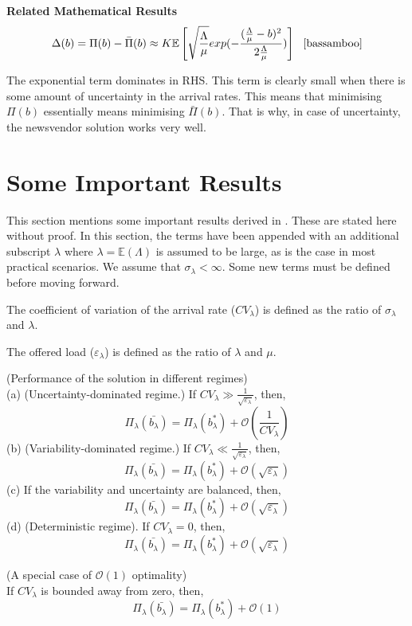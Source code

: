 \textbf{Related Mathematical Results}\\
\[\Delta(b) = \Pi(b) - \bar{\Pi}(b) \approx K\mathbb{E}\left[\sqrt{\frac{\Lambda}{\mu}}exp(-\frac{(\frac{\Lambda}{\mu}-b)^2}{2\frac{\Lambda}{\mu}})\right] \ \ \cite{bassamboo}\]

\begin{remark}
The exponential term dominates in RHS. This term is clearly small when there is some amount of uncertainty in the arrival rates. This means that minimising $\Pi(b)$ essentially means minimising $\bar{\Pi}(b)$. That is why, in case of uncertainty, the newsvendor solution works very well.   
\end{remark}
\section{Some Important Results}
This section mentions some important results derived in \cite{bassamboo}. These are stated here without proof. In this section, the terms have been appended with an additional subscript $\lambda$ where $\lambda=\mathbb{E}(\Lambda)$ is assumed to be large, as is the case in most practical scenarios. We assume that $\sigma_{\lambda} < \infty$. Some new terms must be defined before moving forward.
\begin{definition}\label{}
The coefficient of variation of the arrival rate ($CV_{\lambda}$) is defined as the ratio of $\sigma_{\lambda}$ and $\lambda$.
\end{definition}

\begin{definition}\label{}
The offered load ($\varepsilon_{\lambda}$) is defined as the ratio of $\lambda$ and $\mu$.
\end{definition}

\begin{theorem} (Performance of the solution in different regimes) \\
(a) (Uncertainty-dominated regime.) If $CV_{\lambda} \gg \frac{1}{\sqrt{\varepsilon_{\lambda}}}$, then, 
\[\Pi_{\lambda}(\bar{b_{\lambda}}) = \Pi_{\lambda}(b_{\lambda}^*) + \mathcal{O}\left(\frac{1}{CV_{\lambda}}\right)\]
(b) (Variability-dominated regime.) If $CV_{\lambda} \ll \frac{1}{\sqrt{\varepsilon_{\lambda}}}$, then, 
\[\Pi_{\lambda}(\bar{b_{\lambda}}) = \Pi_{\lambda}(b_{\lambda}^*) + \mathcal{O}(\sqrt{\varepsilon_{\lambda}})\]
(c) If the variability and uncertainty are balanced, then, 
\[\Pi_{\lambda}(\bar{b_{\lambda}}) = \Pi_{\lambda}(b_{\lambda}^*) + \mathcal{O}(\sqrt{\varepsilon_{\lambda}})\]
(d) (Deterministic regime). If $CV_{\lambda}=0$, then, 
\[\Pi_{\lambda}(\bar{b_{\lambda}}) = \Pi_{\lambda}(b_{\lambda}^*) + \mathcal{O}(\sqrt{\varepsilon_{\lambda}})\]
\end{theorem}

\begin{theorem} (A special case of $\mathcal{O}(1)$ optimality) \\
If $CV_{\lambda}$ is bounded away from zero, then, 
\[\Pi_{\lambda}(\bar{b_{\lambda}}) = \Pi_{\lambda}(b_{\lambda}^*) + \mathcal{O}(1)\]
\end{theorem}